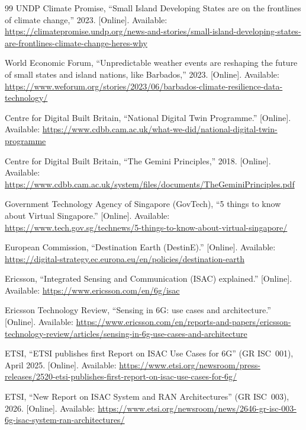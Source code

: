 \documentclass[10pt,twocolumn]{article}
\begin{document}
\balance
\begin{thebibliography}{99}
\small
{} UNDP Climate Promise, ``Small Island Developing States are on
the frontlines of climate change,'' 2023. [Online]. Available:
\url{https://climatepromise.undp.org/news-and-stories/small-island-developing-states-are-frontlines-climate-change-heres-why}

 World Economic Forum, ``Unpredictable weather events are
reshaping the future of small states and island nations, like Barbados,'' 2023.
[Online]. Available:
\url{https://www.weforum.org/stories/2023/06/barbados-climate-resilience-data-technology/}

 Centre for Digital Built Britain, ``National Digital Twin
Programme.'' [Online]. Available:
\url{https://www.cdbb.cam.ac.uk/what-we-did/national-digital-twin-programme}

 Centre for Digital Built Britain, ``The Gemini Principles,''
2018. [Online]. Available:
\url{https://www.cdbb.cam.ac.uk/system/files/documents/TheGeminiPrinciples.pdf}

 Government Technology Agency of Singapore (GovTech), ``5 things to
know about Virtual Singapore.'' [Online]. Available:
\url{https://www.tech.gov.sg/technews/5-things-to-know-about-virtual-singapore/}

 European Commission, ``Destination Earth (DestinE).''
[Online]. Available:
\url{https://digital-strategy.ec.europa.eu/en/policies/destination-earth}

 Ericsson, ``Integrated Sensing and Communication
(ISAC) explained.'' [Online]. Available:
\url{https://www.ericsson.com/en/6g/isac}

 Ericsson Technology Review, ``Sensing in 6G: use cases
and architecture.'' [Online]. Available:
\url{https://www.ericsson.com/en/reports-and-papers/ericsson-technology-review/articles/sensing-in-6g-use-cases-and-architecture}

 ETSI, ``ETSI publishes first Report on ISAC Use Cases for
6G'' (GR ISC~001), April 2025. [Online]. Available:
\url{https://www.etsi.org/newsroom/press-releases/2520-etsi-publishes-first-report-on-isac-use-cases-for-6g/}

 ETSI, ``New Report on ISAC System and RAN Architectures''
(GR ISC~003), 2026. [Online]. Available:
\url{https://www.etsi.org/newsroom/news/2646-gr-isc-003-6g-isac-system-ran-architectures/}


\end{thebibliography}
\end{document}
